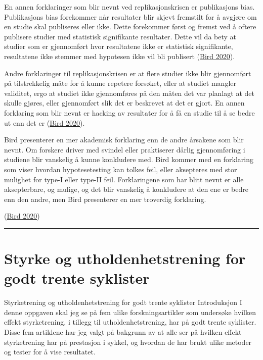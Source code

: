 \documentclass[
]{book}
\begin{document}
En annen forklaringer som blir nevnt ved replikasjonskrisen er
publikasjons bias. Publikasjons bias forekommer når resultater blir
skjevt fremstilt for å avgjøre om en studie skal publiseres eller ikke.
Dette forekommer først og fremst ved å oftere publisere studier med
statistisk signifikante resultater. Dette vil da bety at studier som er
gjennomført hvor resultatene ikke er statistisk signifikante,
resultatene ikke stemmer med hypotesen ikke vil bli publisert
(\protect\hyperlink{ref-bird2020}{Bird 2020}).

Andre forklaringer til replikasjonskrisen er at flere studier ikke blir
gjennomført på tilstrekkelig måte for å kunne repetere forsøket, eller
at studiet mangler validitet, ergo at studiet ikke gjennomføres på den
måten det var planlagt at det skulle gjøres, eller gjennomført slik det
er beskrevet at det er gjort. En annen forklaring som blir nevnt er
hacking av resultater for å få en studie til å se bedre ut enn det er
(\protect\hyperlink{ref-bird2020}{Bird 2020}).

Bird presenterer en mer akademisk forklaring enn de andre årsakene som
blir nevnt. Om forskere driver med svindel eller praktiserer dårlig
gjennomføring i studiene blir vanskelig å kunne konkludere med. Bird
kommer med en forklaring som viser hvordan hypotesetesting kan tolkes
feil, eller aksepteres med stor mulighet for type-I eller type-II feil.
Forklaringene som har blitt nevnt er alle aksepterbare, og mulige, og
det blir vanskelig å konkludere at den ene er bedre enn den andre, men
Bird presenterer en mer troverdig forklaring.

(\protect\hyperlink{ref-bird2020}{Bird 2020})

\begin{center}\rule{0.5\linewidth}{0.5pt}\end{center}

\hypertarget{styrke-og-utholdenhetstrening-for-godt-trente-syklister}{%
\chapter{Styrke og utholdenhetstrening for godt trente
syklister}\label{styrke-og-utholdenhetstrening-for-godt-trente-syklister}}

Styrketrening og utholdenhetstrening for godt trente syklister
Introduksjon I denne oppgaven skal jeg se på fem ulike
forskningsartikler som undersøke hvilken effekt styrketrening, i tillegg
til utholdenhetstrening, har på godt trente syklister. Disse fem
artiklene har jeg valgt på bakgrunn av at alle ser på hvilken effekt
styrketrening har på prestasjon i sykkel, og hvordan de har brukt ulike
metoder og tester for å vise resultatet.
\end{document}
